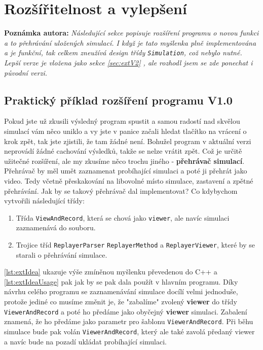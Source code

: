 \chapter{Rozšířitelnost a vylepšení}
\textbf{Poznámka autora: }\textit{Následující sekce popisuje rozšíření programu o novou funkci a to přehrávání uložených simulací. I když je tato myšlenka plně implementována a je funkční, tak celkem zneužívá design třídy \texttt{Simulation}, což nebylo nutné. Lepší verze je vložena jako sekce \ref{sec:extV2} , ale rozhodl jsem se zde ponechat i původní verzi. }
\section{Praktický příklad rozšíření programu V1.0}

Pokud jste už zkusili výsledný program spustit a samou radostí nad skvělou simulací vám něco uniklo a vy jste v panice začali hledat tlačítko na vrácení o krok zpět, tak jste zjistili, že tam žádné není. Bohužel program v aktuální verzi neprovádí žádné cachování výsledků, takže se nelze vrátit zpět. Což je určitě užitečné rozšíření, ale my zkusíme něco trochu jiného - \textbf{přehrávač simulací}.
Přehrávač by měl umět zaznamenat probíhající simulaci a poté ji přehrát jako video. Tedy včetně přeskakování na libovolné místo simulace, zastavení a zpětné přehrávání.
Jak by se takový přehrávač dal implementovat?
Co kdybychom vytvořili následující třídy:
\begin{enumerate}
	\item Třída \texttt{ViewAndRecord}, která se chová jako \texttt{viewer}, ale navíc simulaci zaznamenává do souboru. 
	\item Trojice tříd \texttt{ReplayerParser} \texttt{ReplayerMethod} a \texttt{ReplayerViewer}, které by se starali o přehrávání simulace.
\end{enumerate}
\ref{lst:extIdea} ukazuje výše zmíněnou myšlenku převedenou do C++ a  \ref{lst:extIdeaUsage} pak jak by se pak dala použít v hlavním programu.
Díky návrhu celého programu se zaznamenávání simulace docílí velmi jednoduše, protože jediné co musíme změnit je, že "zabalíme" zvolený \textbf{viewer} do třídy \texttt{ViewerAndRecord} a poté ho předáme jako obyčejný \textbf{viewer} simulaci. Zabalení znamená, že ho předáme jako parametr pro šablonu \texttt{ViewerAndRecord}. Při běhu simulace bude pak volán \texttt{ViewerAndRecord}, který ale také zavolá předaný viewer a navíc bude na pozadí ukládat probíhající simulaci.

